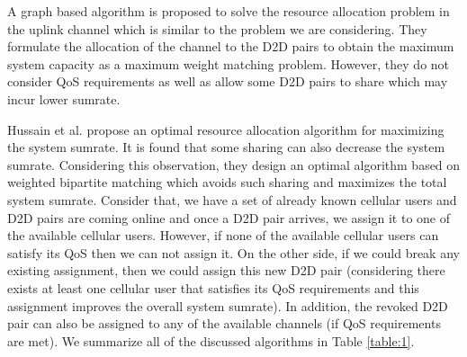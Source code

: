 \documentclass[times]{dacauth}
\begin{document}
\smallskip
\noindent
A graph based algorithm \cite{zhang} is proposed to solve the resource allocation problem in the uplink channel which is similar to the problem we are considering. They formulate the allocation of the channel to the D2D pairs to obtain the maximum system capacity as a maximum weight matching problem. However, they do not consider QoS requirements as well as allow some D2D pairs to share which may incur lower sumrate.
 
\smallskip
\noindent
Hussain et al. \cite{ccnc} propose an optimal resource allocation algorithm for maximizing the system sumrate. It is found that some sharing can also decrease the system sumrate. Considering this observation, they design an optimal algorithm based on weighted bipartite matching which avoids such sharing and maximizes the total system sumrate. Consider that, we have a set of already known cellular users and D2D pairs are coming online and once a D2D pair arrives, we assign it to one of the available cellular users. However, if none of the available cellular users can satisfy its QoS then we can not assign it. On the other side, if we could break any existing assignment, then we could assign this new D2D pair (considering there exists at least one cellular user that satisfies its QoS requirements and this assignment improves the overall system sumrate). In addition, the revoked D2D pair can also be assigned to any of the available channels (if QoS requirements are met). We summarize all of the discussed algorithms in Table \ref{table:1}.
\end{document}

